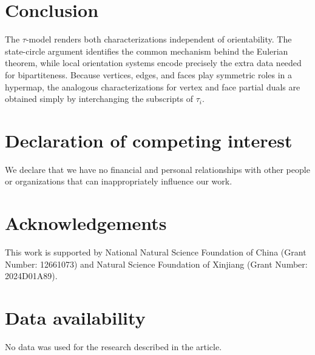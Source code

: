\documentclass[10pt,a4paper]{article}
\theoremstyle{definition}
\theoremstyle{remark}
\begin{document}
\section{Conclusion}

The $\tau$-model renders both characterizations independent of orientability. The state-circle argument identifies the common mechanism behind the Eulerian theorem, while local orientation systems encode precisely the extra data needed for bipartiteness. Because vertices, edges, and faces play symmetric roles in a hypermap, the analogous characterizations for vertex and face partial duals are obtained simply by interchanging the subscripts of $\tau_i$.

\section*{Declaration of competing interest}
We declare that we have no financial and personal relationships with other people or organizations that can inappropriately influence our work.

\section*{Acknowledgements}
This work is supported by National Natural Science Foundation of China (Grant Number: 12661073) and Natural Science Foundation of Xinjiang (Grant Number: 2024D01A89).

\section*{Data availability}
No data was used for the research described in the article.



\end{document}
